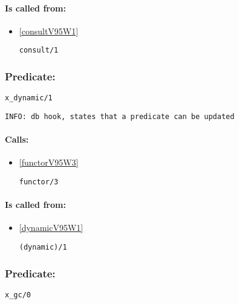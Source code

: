 \paragraph{Is called from:} 
\begin{itemize}
\item \ref{consultV95W1} 
\begin{verbatim}
consult/1
\end{verbatim}

\end{itemize}

\subsubsection{Predicate:} \label{xV95WdynamicV95W1}

\begin{verbatim}
x_dynamic/1
\end{verbatim}

{\small \begin{verbatim}
INFO: db hook, states that a predicate can be updated

\end{verbatim}}
\paragraph{Calls:} 
\begin{itemize}
\item \ref{functorV95W3} 
\begin{verbatim}
functor/3
\end{verbatim}

\end{itemize}
\paragraph{Is called from:} 
\begin{itemize}
\item \ref{dynamicV95W1} 
\begin{verbatim}
(dynamic)/1
\end{verbatim}

\end{itemize}

\subsubsection{Predicate:} \label{xV95WgcV95W0}

\begin{verbatim}
x_gc/0
\end{verbatim}

